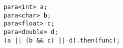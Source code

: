 \begin{lstlisting}
para<int> a;
para<char> b;
para<float> c;
para<double> d;
(a || (b && c) || d).then(func);
\end{lstlisting}
